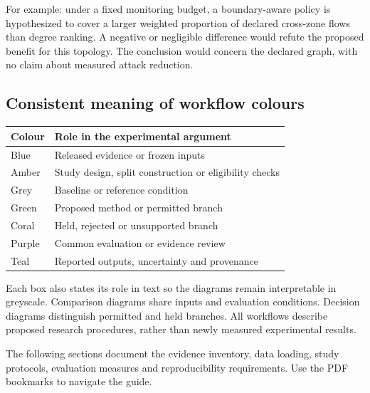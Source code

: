 For example: under a fixed monitoring budget, a boundary-aware policy is hypothesized to cover a larger weighted proportion of declared cross-zone flows than degree ranking. A negative or negligible difference would refute the proposed benefit for this topology. The conclusion would concern the declared graph, with no claim about measured attack reduction.

\subsection*{Consistent meaning of workflow colours}
\begingroup\small\setlength{\tabcolsep}{5pt}\renewcommand{\arraystretch}{1.22}
\begin{tabularx}{\linewidth}{>{\raggedright\arraybackslash}X>{\raggedright\arraybackslash}X}
\toprule
\textbf{Colour} & \textbf{Role in the experimental argument}\\
\midrule
Blue & Released evidence or frozen inputs\\
Amber & Study design, split construction or eligibility checks\\
Grey & Baseline or reference condition\\
Green & Proposed method or permitted branch\\
Coral & Held, rejected or unsupported branch\\
Purple & Common evaluation or evidence review\\
Teal & Reported outputs, uncertainty and provenance\\
\bottomrule\end{tabularx}\endgroup\par\medskip
Each box also states its role in text so the diagrams remain interpretable in greyscale. Comparison diagrams share inputs and evaluation conditions. Decision diagrams distinguish permitted and held branches. All workflows describe proposed research procedures, rather than newly measured experimental results.

The following sections document the evidence inventory, data loading, study protocols, evaluation measures and reproducibility requirements. Use the PDF bookmarks to navigate the guide.

